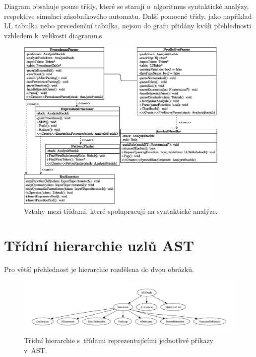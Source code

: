 Diagram obsahuje pouze třídy, které se starají o~algoritmus syntaktické analýzy, respektive simulaci zásobníkového automatu.
Další pomocné třídy, jako například LL tabulka nebo precedenční tabulka, nejsou do grafu přidány kvůli přehlednosti  vzhledem k~velikosti diagramu.s
\begin{figure}[ht]
    \centering
    \includegraphics[width=0.92\textwidth]{obrazky-figures/class_diagram.eps}
    \caption{Vztahy mezi třídami, které spolupracují na syntaktické analýze.}
\end{figure}

\chapter{Třídní hierarchie uzlů AST} \label{kap_priloha_c}
Pro větší přehlednost je hierarchie rozdělena do dvou obrázků.
\begin{figure}[h]
    \centering
    \includegraphics[width=\textwidth]{obrazky-figures/hierarchy_statement.pdf}
    \caption{Třídní hierarchie s~třídami reprezentujícími jednotlivé příkazy v~AST.}
    \label{fig_hierarchie_statement}
\end{figure}

